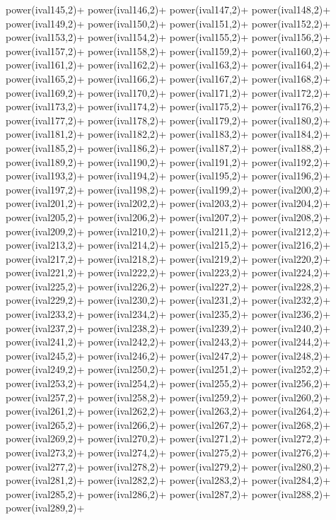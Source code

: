 \begin{DoxyCode}
{power(ival145,2)+
power(ival146,2)+
power(ival147,2)+
power(ival148,2)+
power(ival149,2)+
power(ival150,2)+
power(ival151,2)+
power(ival152,2)+
power(ival153,2)+
power(ival154,2)+
power(ival155,2)+
power(ival156,2)+
power(ival157,2)+
power(ival158,2)+
power(ival159,2)+
power(ival160,2)+
power(ival161,2)+
power(ival162,2)+
power(ival163,2)+
power(ival164,2)+
power(ival165,2)+
power(ival166,2)+
power(ival167,2)+
power(ival168,2)+
power(ival169,2)+
power(ival170,2)+
power(ival171,2)+
power(ival172,2)+
power(ival173,2)+
power(ival174,2)+
power(ival175,2)+
power(ival176,2)+
power(ival177,2)+
power(ival178,2)+
power(ival179,2)+
power(ival180,2)+
power(ival181,2)+
power(ival182,2)+
power(ival183,2)+
power(ival184,2)+
power(ival185,2)+
power(ival186,2)+
power(ival187,2)+
power(ival188,2)+
power(ival189,2)+
power(ival190,2)+
power(ival191,2)+
power(ival192,2)+
power(ival193,2)+
power(ival194,2)+
power(ival195,2)+
power(ival196,2)+
power(ival197,2)+
power(ival198,2)+
power(ival199,2)+
power(ival200,2)+
power(ival201,2)+
power(ival202,2)+
power(ival203,2)+
power(ival204,2)+
power(ival205,2)+
power(ival206,2)+
power(ival207,2)+
power(ival208,2)+
power(ival209,2)+
power(ival210,2)+
power(ival211,2)+
power(ival212,2)+
power(ival213,2)+
power(ival214,2)+
power(ival215,2)+
power(ival216,2)+
power(ival217,2)+
power(ival218,2)+
power(ival219,2)+
power(ival220,2)+
power(ival221,2)+
power(ival222,2)+
power(ival223,2)+
power(ival224,2)+
power(ival225,2)+
power(ival226,2)+
power(ival227,2)+
power(ival228,2)+
power(ival229,2)+
power(ival230,2)+
power(ival231,2)+
power(ival232,2)+
power(ival233,2)+
power(ival234,2)+
power(ival235,2)+
power(ival236,2)+
power(ival237,2)+
power(ival238,2)+
power(ival239,2)+
power(ival240,2)+
power(ival241,2)+
power(ival242,2)+
power(ival243,2)+
power(ival244,2)+
power(ival245,2)+
power(ival246,2)+
power(ival247,2)+
power(ival248,2)+
power(ival249,2)+
power(ival250,2)+
power(ival251,2)+
power(ival252,2)+
power(ival253,2)+
power(ival254,2)+
power(ival255,2)+
power(ival256,2)+
power(ival257,2)+
power(ival258,2)+
power(ival259,2)+
power(ival260,2)+
power(ival261,2)+
power(ival262,2)+
power(ival263,2)+
power(ival264,2)+
power(ival265,2)+
power(ival266,2)+
power(ival267,2)+
power(ival268,2)+
power(ival269,2)+
power(ival270,2)+
power(ival271,2)+
power(ival272,2)+
power(ival273,2)+
power(ival274,2)+
power(ival275,2)+
power(ival276,2)+
power(ival277,2)+
power(ival278,2)+
power(ival279,2)+
power(ival280,2)+
power(ival281,2)+
power(ival282,2)+
power(ival283,2)+
power(ival284,2)+
power(ival285,2)+
power(ival286,2)+
power(ival287,2)+
power(ival288,2)+
power(ival289,2)+
}
\end{DoxyCode}
